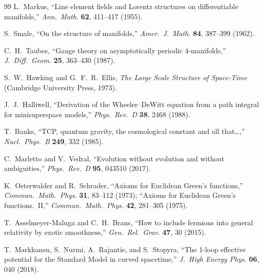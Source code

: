 \documentclass[12pt,a4paper]{article}
\theoremstyle{definition}
\theoremstyle{remark}
\begin{document}
\begin{thebibliography}{99}
L.~Markus,
``Line element fields and Lorentz structures on differentiable manifolds,''
\textit{Ann.\ Math.} \textbf{62}, 411--417 (1955).

S.~Smale,
``On the structure of manifolds,''
\textit{Amer.\ J.\ Math.} \textbf{84}, 387--399 (1962).

C.~H.~Taubes,
``Gauge theory on asymptotically periodic $4$-manifolds,''
\textit{J.\ Diff.\ Geom.} \textbf{25}, 363--430 (1987).

S.~W.~Hawking and G.~F.~R.~Ellis,
\textit{The Large Scale Structure of Space-Time}
(Cambridge University Press, 1973).

J.~J.~Halliwell,
``Derivation of the Wheeler--DeWitt equation from a path integral for
minisuperspace models,''
\textit{Phys.\ Rev.\ D} \textbf{38}, 2468 (1988).

T.~Banks,
``TCP, quantum gravity, the cosmological constant and all that\ldots,''
\textit{Nucl.\ Phys.\ B} \textbf{249}, 332 (1985).

C.~Marletto and V.~Vedral,
``Evolution without evolution and without ambiguities,''
\textit{Phys.\ Rev.\ D} \textbf{95}, 043510 (2017).

K.~Osterwalder and R.~Schrader,
``Axioms for Euclidean Green's functions,''
\textit{Commun.\ Math.\ Phys.} \textbf{31}, 83--112 (1973);
``Axioms for Euclidean Green's functions.\ II,''
\textit{Commun.\ Math.\ Phys.} \textbf{42}, 281--305 (1975).

T.~Asselmeyer-Maluga and C.~H.~Brans,
``How to include fermions into general relativity by exotic smoothness,''
\textit{Gen.\ Rel.\ Grav.} \textbf{47}, 30 (2015).

T.~Markkanen, S.~Nurmi, A.~Rajantie, and S.~Stopyra,
``The 1-loop effective potential for the Standard Model in curved
spacetime,''
\textit{J.\ High Energy Phys.} \textbf{06}, 040 (2018).

\end{thebibliography}
\end{document}
